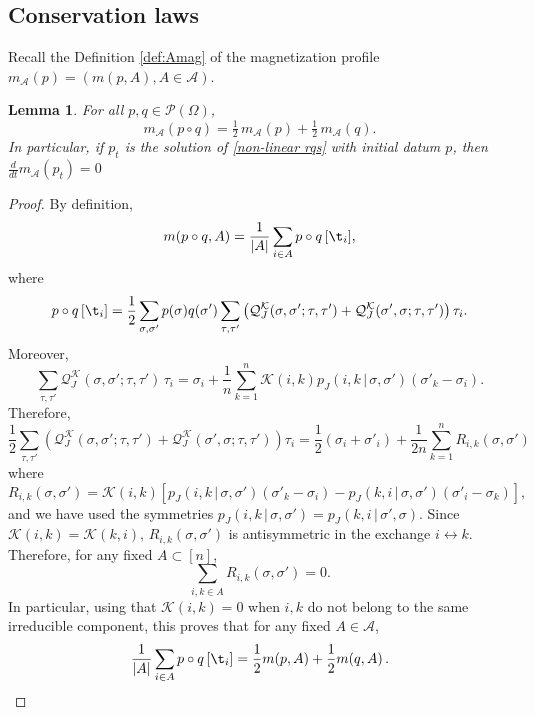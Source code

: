 \documentclass[11pt,reqno]{amsart}
\numberwithin{equation}{section}
\numberwithin{figure}{section}
\newtheorem{lemma}[theorem]{Lemma}
\newcommand{\1}{\mathds{1}}
\newcommand{\tc}{\,|\,}
\let\si=\sigma
\newcommand{\cA}{\ensuremath{\mathcal A}}
\newcommand{\cK}{\ensuremath{\mathcal K}}
\begin{document}
\subsection{Conservation laws}
Recall the Definition \ref{def:Amag} of the magnetization profile $m_\cA(p) = (m(p,A), A\in\cA)$. 

\begin{lemma}\label{conserved magn}
For all \(p, q \in \mathcal{P}(\Omega)\), 
\begin{equation}
\label{magn1}
  m_{\mathcal{A}}(p \circ q) = \tfrac{1}{2}\,m_{\mathcal{A}}(p )+ \tfrac{1}{2}\,m_{\mathcal{A}}(q).
\end{equation}
In particular, if \(p_t\) is the solution of \eqref{non-linear rqs} with initial datum \(p\), then
$ \frac{d}{dt} m_\cA(p_t)= 0$ %
%
\end{lemma}

\begin{proof}
By  definition, 
\[
 m(p \circ q,A) 
 = \frac{1}{|A|} \sum_{i \in A} p \circ q \,[\t_i],
\]
where 
\[
p \circ q \,[\t_i]=
 \frac{1}{2} \sum_{\sigma, \sigma'}  p(\sigma) q(\sigma') \sum_{\tau, \tau'} \left(\mathcal{Q}^{\mathcal{K}}_J(\sigma, \sigma'; \tau, \tau') + \mathcal{Q}^{\mathcal{K}}_J(\sigma', \sigma; \tau, \tau')\right) \tau_i.
\]
Moreover,
\[
\sum_{\tau, \tau'} \mathcal{Q}^{\mathcal{K}}_J(\sigma, \sigma'; \tau, \tau') \,\tau_i
= \si_i  + \frac1n \sum_{ k=1}^n \cK(i,k) p_J(i, k \tc \sigma, \sigma') (\sigma'_k-\sigma_i).
\]
Therefore, %
\[
\frac12\sum_{\tau, \tau'} \left(\mathcal{Q}^{\mathcal{K}}_J(\sigma, \sigma'; \tau, \tau') + \mathcal{Q}^{\mathcal{K}}_J(\sigma', \sigma; \tau, \tau')\right)\tau_i
= \frac12(\si_i+\si'_i)  + \frac1{2n} \sum_{ k=1}^nR_{i,k}(\si,\si')
\]
where
\[
R_{i,k}(\si,\si')=\cK(i,k) \left[p_J(i, k \tc \sigma, \sigma') (\sigma'_k-\sigma_i) - p_J(k,i \tc \sigma, \sigma') (\sigma'_i-\sigma_k) \right],
\]
and we have used the symmetries %
$p_J(i, k \tc \sigma, \sigma')=p_J(k,i \tc \sigma', \sigma)$.
Since $\cK(i,k)=\cK(k,i)$,  $R_{i,k}(\si,\si')$ is antisymmetric in the exchange $i\leftrightarrow k$. Therefore, for any fixed $A\subset [n]$, 
\[
\sum_{i,k\in A}R_{i,k}(\si,\si')=0.
\]
In particular, using that $\cK(i,k)=0$ when $i,k$ do not belong to the same irreducible component, this proves that for any fixed $A\in\cA$,
 \[
\frac1{|A|}\sum_{i\in A} p \circ q \,[\t_i]=\frac12 m(p ,A) + \frac12 m(q ,A)\,. 
\]
\end{proof}
\end{document}
